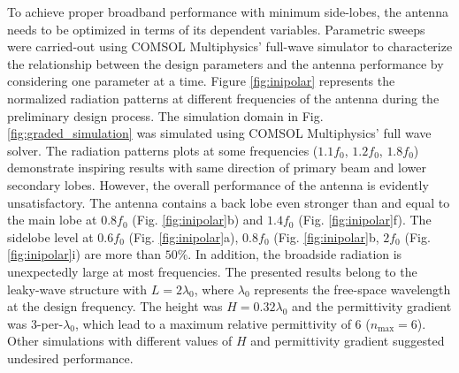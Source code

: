 To achieve proper broadband performance with minimum side-lobes, the antenna needs to be optimized in terms of its dependent variables. Parametric sweeps were carried-out using COMSOL Multiphysics' full-wave simulator to characterize the relationship between the design parameters and the antenna performance by considering one parameter at a time. Figure \ref{fig:inipolar} represents the normalized radiation patterns at different frequencies of the antenna during the preliminary design process. The simulation domain in Fig. \ref{fig:graded_simulation} was simulated using COMSOL Multiphysics' full wave solver. The radiation patterns plots at some frequencies ($1.1f_0$, $1.2f_0$, $1.8f_0$) demonstrate inspiring results with same direction of primary beam and lower secondary lobes. However, the overall performance of the antenna is evidently unsatisfactory. The antenna contains a back lobe even stronger than and equal to the main lobe at $0.8f_0$ (Fig. \ref{fig:inipolar}b) and $1.4f_0$ (Fig. \ref{fig:inipolar}f). The sidelobe level at $0.6f_0$  (Fig. \ref{fig:inipolar}a), $0.8f_0$ (Fig. \ref{fig:inipolar}b, $2f_0$ (Fig. \ref{fig:inipolar}i) are more than $50\%$. In addition, the broadside radiation is unexpectedly large at most frequencies. The presented results belong to the leaky-wave structure with $L=2\lambda_0$, where $\lambda_0$ represents the free-space wavelength at the design frequency. The height was $H=0.32\lambda_0$ and the permittivity gradient was $3$-per-$\lambda_0$, which lead to a maximum relative permittivity of $6$ ($n_{\mathrm{max}}=6$). Other simulations with different values of $H$ and permittivity gradient suggested undesired performance.
%
